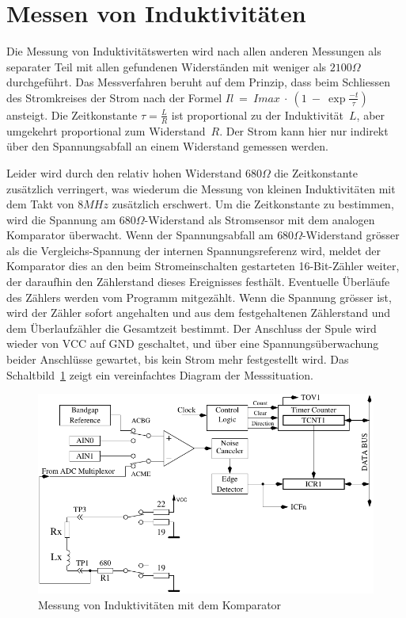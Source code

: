 \section{Messen von Induktivitäten}
Die Messung von Induktivitätswerten wird nach allen anderen Messungen als separater Teil mit allen
gefundenen Widerständen mit weniger als \(2100\Omega\) durchgeführt.
Das Messverfahren beruht auf dem Prinzip, dass beim Schliessen des Stromkreises der Strom nach
der Formel \(Il~=~Imax~\cdot~(1~-~\exp{\frac{-t}{\tau}})\) ansteigt.
Die Zeitkonstante \(\tau = \frac{L}{R}\) ist proportional zu der Induktivität~\(L\), aber umgekehrt
proportional zum Widerstand~\(R\). 
Der Strom kann hier nur indirekt über den Spannungsabfall an einem Widerstand
gemessen werden.

Leider wird durch den relativ hohen Widerstand \(680\Omega\) die Zeitkonstante zusätzlich verringert, was
wiederum die Messung von kleinen Induktivitäten mit dem Takt von \(8MHz\) zusätzlich erschwert.
Um die Zeitkonstante zu bestimmen, wird die Spannung am \(680\Omega\)-Widerstand als Stromsensor
mit dem analogen Komparator überwacht. Wenn der Spannungsabfall am \(680\Omega\)-Widerstand grösser als
die Vergleichs-Spannung der internen Spannungsreferenz wird, meldet der Komparator dies an den beim
Stromeinschalten gestarteten 16-Bit-Zähler weiter, der daraufhin den Zählerstand dieses
Ereignisses festhält. Eventuelle Überläufe des Zählers werden vom Programm mitgezählt. 
Wenn die Spannung grösser ist, wird der Zähler sofort angehalten und aus dem festgehaltenen Zählerstand und
dem Überlaufzähler die Gesamtzeit bestimmt.
Der Anschluss der Spule wird wieder von VCC auf GND geschaltet, und über eine Spannungsüberwachung beider
Anschlüsse gewartet, bis kein Strom mehr festgestellt wird.
Das Schaltbild~\ref{fig:Inductance} zeigt ein vereinfachtes Diagram der Messsituation.

\begin{figure}[H]
\centering
\includegraphics[]{../FIG/Inductance.pdf}
\caption{Messung von Induktivitäten mit dem Komparator}
\label{fig:Inductance}
\end{figure}

